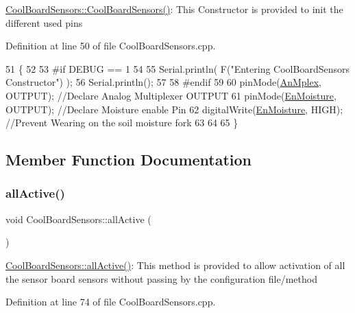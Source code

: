 \hyperlink{class_cool_board_sensors_a91ff2a02f5486f90cf2413a1cf8a9ed4}{Cool\+Board\+Sensors\+::\+Cool\+Board\+Sensors()}\+: This Constructor is provided to init the different used pins 

Definition at line 50 of file Cool\+Board\+Sensors.\+cpp.


\begin{DoxyCode}
51 \{
52 
53 \textcolor{preprocessor}{#if DEBUG == 1}
54 
55     Serial.println( F(\textcolor{stringliteral}{"Entering CoolBoardSensors Constructor"}) );
56     Serial.println();
57 
58 \textcolor{preprocessor}{#endif}
59     
60     pinMode(\hyperlink{class_cool_board_sensors_a12ef28b1046219e0aee10bf64e28c4a5}{AnMplex}, OUTPUT);                \textcolor{comment}{//Declare Analog Multiplexer OUTPUT}
61     pinMode(\hyperlink{class_cool_board_sensors_a6177d02e14a057a2f171a2e930b5038d}{EnMoisture}, OUTPUT);             \textcolor{comment}{//Declare Moisture enable Pin}
62     digitalWrite(\hyperlink{class_cool_board_sensors_a6177d02e14a057a2f171a2e930b5038d}{EnMoisture}, HIGH);            \textcolor{comment}{//Prevent Wearing on the soil moisture fork}
63 
64 
65 \}
\end{DoxyCode}


\subsection{Member Function Documentation}
\mbox{\label{class_cool_board_sensors_aa432c5aac88f89c31a10766390f23e0b}} 
\subsubsection{\texorpdfstring{all\+Active()}{allActive()}}
{\footnotesize\ttfamily void Cool\+Board\+Sensors\+::all\+Active (\begin{DoxyParamCaption}{ }\end{DoxyParamCaption})}

\hyperlink{class_cool_board_sensors_aa432c5aac88f89c31a10766390f23e0b}{Cool\+Board\+Sensors\+::all\+Active()}\+: This method is provided to allow activation of all the sensor board sensors without passing by the configuration file/method 

Definition at line 74 of file Cool\+Board\+Sensors.\+cpp.


